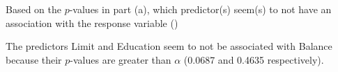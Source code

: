 Based on the $p$-values in part (a), which predictor(s) seem(s) to not have an
association with the response variable ()

\soln* The predictors Limit and Education seem to not be associated with Balance because their $p$-values are greater than $\alpha$ (0.0687 and 0.4635 respectively).